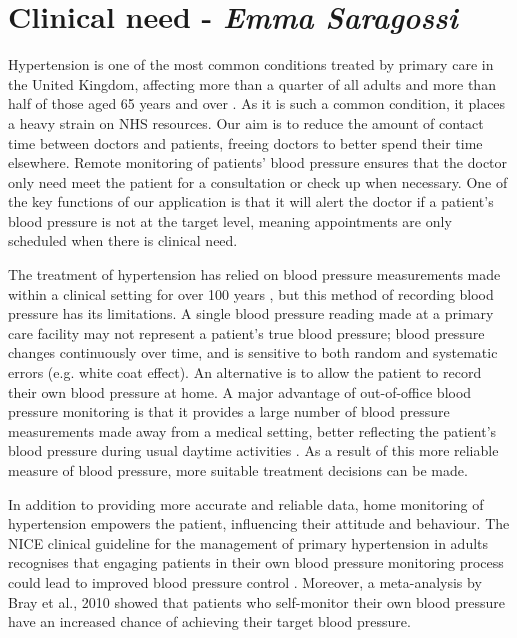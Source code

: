 \documentclass[11pt]{article}
\begin{document}

\section{Clinical need - \textit{Emma Saragossi}}
Hypertension is one of the most common conditions treated by primary care in the United Kingdom, affecting more than a quarter of all adults and more than half of those aged 65 years and over \cite{surveyEngland2009}. As it is such a common condition, it places a heavy strain on NHS resources. Our aim is to reduce the amount of contact time between doctors and patients, freeing doctors to better spend their time elsewhere. Remote monitoring of patients' blood pressure ensures that the doctor only need meet the patient for a consultation or check up when necessary. One of the key functions of our application is that it will alert the doctor if a patient's blood pressure is not at the target level, meaning appointments are only scheduled when there is clinical need.

The treatment of hypertension has relied on blood pressure measurements made within a clinical setting for over 100 years \cite{SICC}, but this method of recording blood pressure has its limitations. A single blood pressure reading made at a primary care facility may not represent a patient's true blood pressure; blood pressure changes continuously over time, and is sensitive to both random and systematic errors (e.g. white coat effect). An alternative is to allow the patient to record their own blood pressure at home. A major advantage of out-of-office blood pressure monitoring is that it provides a large number of blood pressure measurements made away from a medical setting, better reflecting the patient's blood pressure during usual daytime activities \cite{ESH}. As a result of this more reliable measure of blood pressure, more suitable treatment decisions can be made.

In addition to providing more accurate and reliable data, home monitoring of hypertension empowers the patient, influencing their attitude and behaviour. The NICE clinical guideline for the management of primary hypertension in adults recognises that engaging patients in their own blood pressure monitoring process could lead to improved blood pressure control \cite{CG127}. Moreover, a meta-analysis by Bray et al., 2010 \cite{metaSelfMonitoring} showed that patients who self-monitor their own blood pressure have an increased chance of achieving their target blood pressure.
\end{document}
